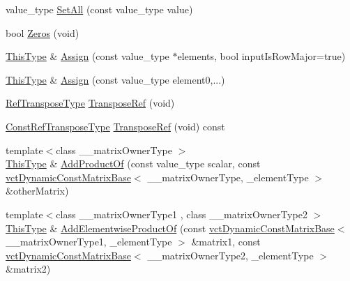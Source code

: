 \begin{DoxyCompactItemize}
\item 
value\-\_\-type \hyperlink{classvct_dynamic_matrix_base_ad7e53be82e28a75b78ed3bd8e4923035}{Set\-All} (const value\-\_\-type value)
\item 
bool \hyperlink{classvct_dynamic_matrix_base_af0acec85f5189a08af876fbb3fbb2f59}{Zeros} (void)
\item 
\hyperlink{classvct_dynamic_const_matrix_base_ac4ff48cbe4d9de3fdef5a02447ffb9db}{This\-Type} \& \hyperlink{classvct_dynamic_matrix_base_a307776c7d6b195a515889143025c8adb}{Assign} (const value\-\_\-type $\ast$elements, bool input\-Is\-Row\-Major=true)
\item 
\hyperlink{classvct_dynamic_const_matrix_base_ac4ff48cbe4d9de3fdef5a02447ffb9db}{This\-Type} \& \hyperlink{classvct_dynamic_matrix_base_a56e29fd345cfba47b1a38c2d01e58c06}{Assign} (const value\-\_\-type element0,...)
\item 
\hyperlink{classvct_dynamic_const_matrix_base_afff0f3bee56a8562e0ec772b35e24475}{Ref\-Transpose\-Type} \hyperlink{classvct_dynamic_matrix_base_a73bb42861eed892ff9c8b96a0be72346}{Transpose\-Ref} (void)
\item 
\hyperlink{classvct_dynamic_const_matrix_base_a2ee053ef5a591f470076e2a0c215fa44}{Const\-Ref\-Transpose\-Type} \hyperlink{classvct_dynamic_matrix_base_afc8fcb2076b6a70b60c2f45b31e2b2c3}{Transpose\-Ref} (void) const 
\item 
{\footnotesize template$<$class \-\_\-\-\_\-matrix\-Owner\-Type $>$ }\\\hyperlink{classvct_dynamic_const_matrix_base_ac4ff48cbe4d9de3fdef5a02447ffb9db}{This\-Type} \& \hyperlink{classvct_dynamic_matrix_base_a460d89e570f8f6594275e14e1c98181a}{Add\-Product\-Of} (const value\-\_\-type scalar, const \hyperlink{classvct_dynamic_const_matrix_base}{vct\-Dynamic\-Const\-Matrix\-Base}$<$ \-\_\-\-\_\-matrix\-Owner\-Type, \-\_\-element\-Type $>$ \&other\-Matrix)
\item 
{\footnotesize template$<$class \-\_\-\-\_\-matrix\-Owner\-Type1 , class \-\_\-\-\_\-matrix\-Owner\-Type2 $>$ }\\\hyperlink{classvct_dynamic_const_matrix_base_ac4ff48cbe4d9de3fdef5a02447ffb9db}{This\-Type} \& \hyperlink{classvct_dynamic_matrix_base_ac0729a80f95b795ae3beb75a9ac083a0}{Add\-Elementwise\-Product\-Of} (const \hyperlink{classvct_dynamic_const_matrix_base}{vct\-Dynamic\-Const\-Matrix\-Base}$<$ \-\_\-\-\_\-matrix\-Owner\-Type1, \-\_\-element\-Type $>$ \&matrix1, const \hyperlink{classvct_dynamic_const_matrix_base}{vct\-Dynamic\-Const\-Matrix\-Base}$<$ \-\_\-\-\_\-matrix\-Owner\-Type2, \-\_\-element\-Type $>$ \&matrix2)

\end{DoxyCompactItemize}
